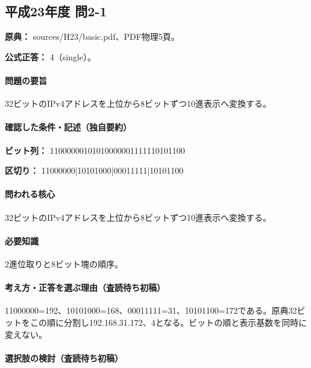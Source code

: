 \subsection{平成23年度 問2-1}
\label{q:h23-reg-basic-2-1}

\noindent\textbf{原典：} sources/H23/basic.pdf、PDF物理5頁。

\textbf{公式正答：} 4（single）。

\paragraph{問題の要旨} 32ビットのIPv4アドレスを上位から8ビットずつ10進表示へ変換する。

\paragraph{確認した条件・記述（独自要約）}\mbox{}\par

\noindent\textbf{ビット列：} 11000000101010000001111110101100\par

\noindent\textbf{区切り：} 11000000|10101000|00011111|10101100\par

\paragraph{問われる核心} 32ビットのIPv4アドレスを上位から8ビットずつ10進表示へ変換する。

\paragraph{必要知識} 2進位取りと8ビット塊の順序。

\paragraph{考え方・正答を選ぶ理由（査読待ち初稿）} 11000000=\allowbreak{}192、10101000=\allowbreak{}168、00011111=\allowbreak{}31、10101100=\allowbreak{}172である。原典32ビットをこの順に分割し192.168.31.172、4となる。ビットの順と表示基数を同時に変えない。

\paragraph{選択肢の検討（査読待ち初稿）}\mbox{}\par


